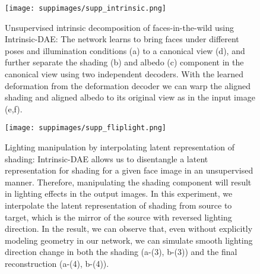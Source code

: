 \documentclass[runningheads]{llncs}
\begin{document}
\begin{figure}[ht]
	\centering
	\texttt{[image: suppimages/supp\_intrinsic.png]}
	\caption{Unsupervised intrinsic decomposition of faces-in-the-wild using Intrinsic-DAE: The network learns to bring faces under different poses and illumination conditions (a) to a canonical view (d), and further separate the shading (b) and albedo (c) component in the canonical view using two independent decoders. With the learned deformation from the deformation decoder we can warp the aligned shading and aligned albedo to its original view as in the input image (e,f).}
	\label{fig:supp_intrinsic}
\end{figure}


\begin{figure}[ht]
	\centering
	\texttt{[image: suppimages/supp\_fliplight.png]}
	\caption{Lighting manipulation by interpolating latent representation of shading: Intrinsic-DAE allows us to disentangle a latent representation for shading for a given face image in an unsupervised manner. Therefore, manipulating the shading component will result in  lighting effects in the output images. In this experiment, we interpolate the latent representation of shading from source to target, which is the mirror of the source with reversed lighting direction. In the result, we can observe that, even without explicitly modeling geometry in our network, we can simulate smooth lighting direction change in both the shading (a-(3), b-(3)) and the final reconstruction (a-(4), b-(4)).  }
	\label{fig:supp_fliplight}
\end{figure}
\FloatBarrier


\end{document}
